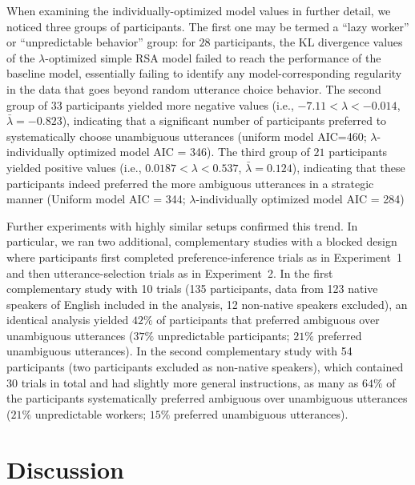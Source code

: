 \documentclass[11pt,a4paper]{article}
\begin{document}
When examining the individually-optimized model values in further detail, we noticed three groups of participants. 
The first one may be termed a ``lazy worker'' or ``unpredictable behavior'' group:
for $28$ participants, the KL divergence values of the $\lambda$-optimized simple RSA model failed to reach the performance of the baseline model, essentially failing to identify any model-corresponding regularity in the data that goes beyond random utterance choice behavior.
The second group of $33$ participants yielded more negative values (i.e., $-7.11<\lambda<-0.014$, $\bar{\lambda}=-0.823$), indicating that a significant number of participants preferred to systematically choose unambiguous utterances (uniform model AIC=460; $\lambda$-individually optimized model AIC = 346). 
The third group of $21$ participants yielded positive values (i.e., $0.0187<\lambda<0.537$, $\bar{\lambda}=0.124$), indicating that these participants indeed preferred the more ambiguous utterances in a strategic manner (Uniform model AIC = 344; $\lambda$-individually optimized model AIC = 284)


Further experiments with highly similar setups confirmed this trend.
In particular, we ran two additional, complementary studies with a blocked design where participants first completed preference-inference trials as in Experiment~1 and then utterance-selection trials as in Experiment~2. 
In the first complementary study with 10 trials (135 participants, data from 123 native speakers of English included in the analysis, 12 non-native speakers excluded), an identical analysis yielded $42\%$ of participants that preferred ambiguous over unambiguous utterances ($37\%$ unpredictable participants; $21\%$ preferred unambiguous utterances). 
In the second complementary study with 54 participants (two participants excluded as non-native speakers), which contained 30 trials in total and had slightly more general instructions, as many as $64\%$ of the participants systematically preferred ambiguous over unambiguous utterances ($21\%$ unpredictable workers; $15\%$ preferred unambiguous utterances). 



\section{Discussion} \label{discussion}
\end{document}
